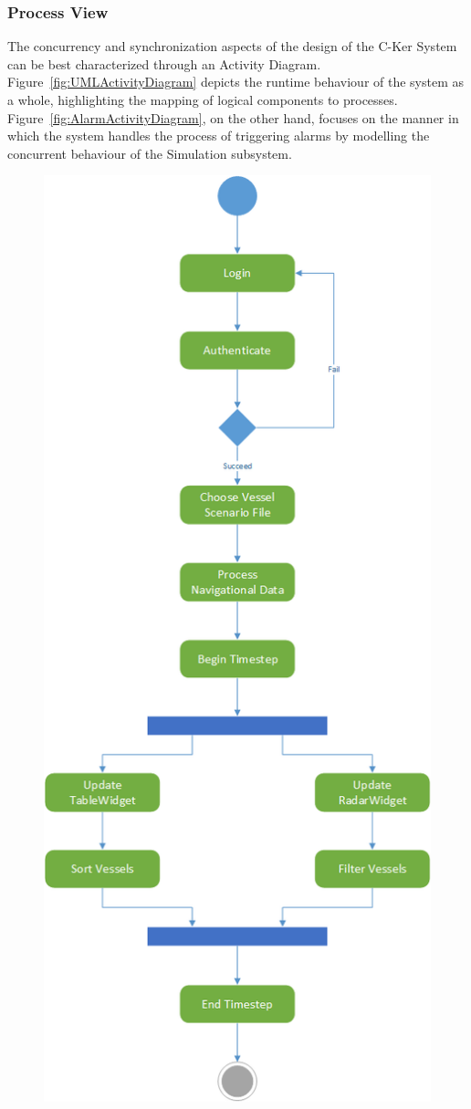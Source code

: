 \documentclass[12pt]{article}
\begin{document}
\subsubsection{Process View}
\par
The concurrency and synchronization aspects of the design of the C-Ker System can be best characterized through an Activity Diagram. Figure~\ref{fig:UMLActivityDiagram} depicts the runtime behaviour of the system as a whole, highlighting the mapping of logical components to processes. Figure~\ref{fig:AlarmActivityDiagram}, on the other hand, focuses on the manner in which the system handles the process of triggering alarms by modelling the concurrent behaviour of the Simulation subsystem.

\begin{figure}[h!]
    \centering
    \includegraphics[scale=0.65]{section_2_activity_diagram}

\end{figure}
\end{document}
